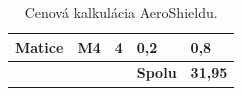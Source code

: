 \begin{table}[!ht]
\begin{tabular}{p{} p{} p{} p{} p{}}
		Matice                              & M4                                                 & 4                                  & 0,2                                      & 0,8                                        \\ \hline
		\multicolumn{1}{|l}{}               &                                                    & \multicolumn{1}{l}{}               & \textbf{Spolu}                           & \multicolumn{1}{c|}{\textbf{31,95}}        \\ \hline
	\end{tabular}
\caption{Cenová kalkulácia AeroShieldu.}
\label{Cenova kalkulacia}
\end{table}